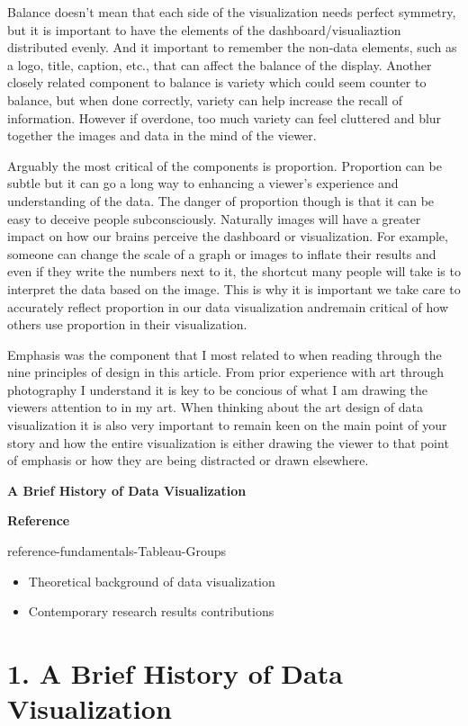 \documentclass[]{book}
\providecommand{\tightlist}{%
  \setlength{\itemsep}{0pt}\setlength{\parskip}{0pt}}
\theoremstyle{definition}
\theoremstyle{definition}
\theoremstyle{definition}
\theoremstyle{remark}
\begin{document}
Balance doesn't mean that each side of the visualization needs perfect
symmetry, but it is important to have the elements of the
dashboard/visualiaztion distributed evenly. And it important to remember
the non-data elements, such as a logo, title, caption, etc., that can
affect the balance of the display. Another closely related component to
balance is variety which could seem counter to balance, but when done
correctly, variety can help increase the recall of information. However
if overdone, too much variety can feel cluttered and blur together the
images and data in the mind of the viewer.

Arguably the most critical of the components is proportion. Proportion
can be subtle but it can go a long way to enhancing a viewer's
experience and understanding of the data. The danger of proportion
though is that it can be easy to deceive people subconsciously.
Naturally images will have a greater impact on how our brains perceive
the dashboard or visualization. For example, someone can change the
scale of a graph or images to inflate their results and even if they
write the numbers next to it, the shortcut many people will take is to
interpret the data based on the image. This is why it is important we
take care to accurately reflect proportion in our data visualization
andremain critical of how others use proportion in their visualization.

Emphasis was the component that I most related to when reading through
the nine principles of design in this article. From prior experience
with art through photography I understand it is key to be concious of
what I am drawing the viewers attention to in my art. When thinking
about the art design of data visualization it is also very important to
remain keen on the main point of your story and how the entire
visualization is either drawing the viewer to that point of emphasis or
how they are being distracted or drawn elsewhere.

\textbf{A Brief History of Data Visualization }

\textbf{Reference}

reference-fundamentals-Tableau-Groups

\begin{itemize}
\tightlist
\item
  Theoretical background of data visualization
\item
  Contemporary research results contributions
\end{itemize}

\section{1. A Brief History of Data
Visualization}\label{a-brief-history-of-data-visualization}
\end{document}
